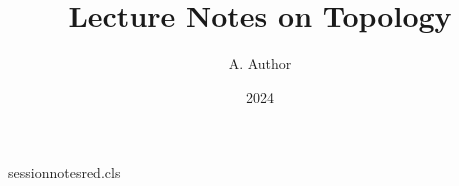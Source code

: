 \begin{filecontents*}[overwrite]{sessionnotesred.cls}
\newcommand\course[1]{\gdef\@course{#1}}
\renewcommand\maketitle{%
  \begin{center}
    {\LARGE \@title \par}
    {\large Course: \@course \par}
    \@tempcnta=\@date\relax
    {\large Exam session \the\@tempcnta \par}
  \end{center}\par}
\end{filecontents*}
\documentclass{sessionnotesred}
\title{Lecture Notes on Topology}
\author{A. Author}
\date{2024}

\maketitle
Text.

